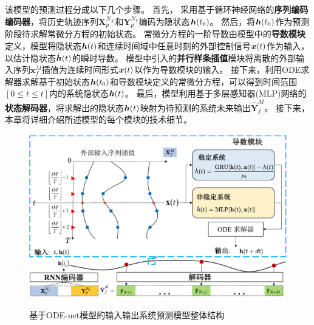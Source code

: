 该模型的预测过程分成以下几个步骤。
首先， 采用基于循环神经网络的\textbf{序列编码 编码器}，将历史轨迹序列$\boldsymbol{X}_{p}^{N_{X}}$和$\boldsymbol{Y}_{p}^{N_{Y}}$编码为隐状态$\boldsymbol h(t_0)$。
然后，将$\boldsymbol h(t_0)$作为预测阶段待求解常微分方程的初始状态。
常微分方程的一阶导数由模型中的\textbf{导数模块}定义，模型将隐状态$\boldsymbol h(t)$和连续时间域中任意时刻的外部控制信号$\boldsymbol x(t)$作为输入，以估计隐状态$\dot{\boldsymbol h}(t)$的瞬时导数。
模型中引入的\textbf{并行样条插值}模块将离散的外部输入序列$\boldsymbol{x}_{f}^{M}$插值为连续时间形式$\boldsymbol x(t)$以作为导数模块的输入。
接下来，利用ODE求解器求解基于初始状态$\boldsymbol h(t_0)$和导数模块定义的常微分方程，可以得到时间范围$[0\leq t \leq t]$内的系统隐状态$\boldsymbol h(t)$。
最后，模型利用基于多层感知器(MLP)网络的\textbf{状态解码器}，将求解出的隐状态$\boldsymbol h(t)$映射为待预测的系统未来输出$\hat{\boldsymbol{Y}}_{f}^{M}$。
接下来，本章将详细介绍所述模型的每个模块的技术细节。

\begin{figure}[t]
    \centering
    \includegraphics[width=1.0\linewidth]{figures/chapter3/model.pdf}
    \caption{
    基于ODE-net模型的输入输出系统预测模型整体结构
    }
    \label{fig:model_structure}
\end{figure}

